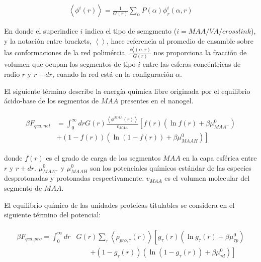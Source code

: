 \begin{align}
	\left< \phi^i(r)\right> = \frac{1}{G(r)} \sum_\alpha{P(\alpha)\phi^i_r(\alpha,r)} 
	\label{eq:esf:ensamble-gel}
\end{align}

En donde el superindice $i$ indica el tipo de semgmento ($i = MAA/VA/crosslink$), y la notaci\'on entre brackets, $\left<\right>$,   hace referencia al promedio de ensamble sobre las conformaciones de la red polim\'ercia. 
$\frac{\phi^i_r(\alpha,r)}{G(r)}$  nos proporciona la fracci\'on de volumen que ocupan los segmentos de tipo $i$ entre las esferas conc\'entricas de radio $r$ y $r + dr$, cuando la red est\'a en la configuraci\'on $\alpha$.




El siguiente t\'ermino describe la energ\'ia qu\'imica libre originada por el equilibrio \'acido-base de los segmentos de $MAA$ presentes en el nanogel.

\begin{align}
	\begin{aligned}
		\beta F_{qca,net} &= \int_0^\infty drG(r) \frac{\left<\phi^{MAA}(r)\right>}{v_{MAA}} \left[f(r)(\ln f(r)+ \beta\mu^0_{MAA^-})\right.\\
		&\left.+(1-f(r))(\ln (1-f(r))+\beta\mu^0_{MAAH})\right]    
	\end{aligned}
\end{align} 


\noindent donde $f(r)$ es el grado de carga de los segmentos $MAA$ en la capa esf\'erica entre $r$ y $r + dr$.
$\mu^0_{MAA^-}$ y $\mu^0_{MAAH}$ son los potenciales qu\'imicos est\'andar de las especies desprotonadas y protonadas respectivamente. $v_{MAA}$ es el volumen molecular del segmento de $MAA$.



El equilibrio qu\'imico de las unidades proteicas titulables se considera en el siguiente t\'ermino del potencial:

\begin{align}
	\begin{aligned}
		\beta F_{qca,pro} =\int_0^\infty dr &G(r) \sum_\tau \left<\rho_{pro,\tau}(r)\right> \left[g_\tau(r)(\ln g_\tau(r)+ \beta\mu^0_{\tau p})\right.\\
		&\qquad\left.+(1-g_\tau(r))(\ln (1-g_\tau(r))+\beta\mu^0_{\tau d})\right]
		\label{eq:esf:fca-pro}   
	\end{aligned}
\end{align} 

